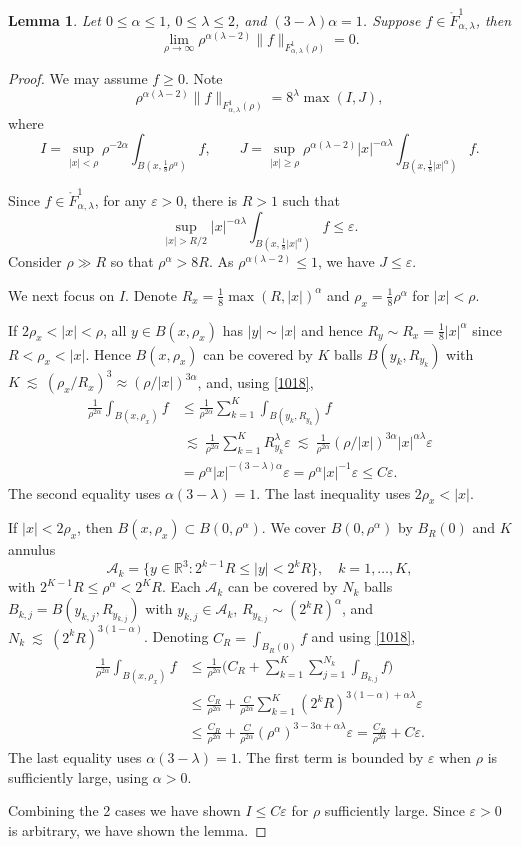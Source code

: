 \documentclass[11pt]{article}
\numberwithin{equation}{section}
\newtheorem{lem}[thm]{Lemma}
\theoremstyle{remark}
\theoremstyle{definition}
\newcommand{\R}{\mathbb{R}}
\newcommand{\lec}{{\ \lesssim \ }}
\newcommand\al{\alpha}
\newcommand\e {\varepsilon}  %
\newcommand\la{\lambda}
\newcommand{\EQ}[1]{\begin{equation} #1 \end{equation}}
\newcommand{\EQN}[1]{\begin{equation*}\begin{split} #1 \end{split}\end{equation*}}
\begin{document}
\begin{lem}\label{lem2.9}
Let $0 \le \al \le 1$, $0 \le \la \le 2$, and $(3-\la)\al=1$. Suppose $f \in \mathring F^1_{\al,\la}$, then
\[
\lim_{\rho\to \infty} \rho^{\al(\la-2)} \|f\|_{F^{1}_{\al,\lambda}(\rho)} =0.
\]
\end{lem}
\begin{proof}
We may assume $f\ge 0$. Note
\[
\rho^{\al(\la-2)} \|f\|_{F^{1}_{\al,\lambda}(\rho)} = 8^\la \max(I,J),
\]
where
\[
I= \sup_{|x|<\rho} \rho^{-2\al} \int_{B(x,\frac18 \rho^\al)} f,\qquad
J= \sup_{|x|\ge\rho} \rho^{\al(\la-2)} |x|^{-\al \la} \int_{B(x,\frac18 |x|^\al)} f.
\]

Since $f \in \mathring F^1_{\al,\la}$,
for any $\e>0$, there is $R>1$ such that
\EQ{\label{1018}
\sup_{|x|>R/2} |x|^{-\al \la} \int_{B(x,\frac18 |x|^\al)} f \le \e.
}
Consider $\rho \gg R$ so that $\rho^\al > 8R$. As $ \rho^{\al(\la-2)}\le1$, we have $J \le \e$.

We next focus on $I$. Denote $R_x = \frac18\max(R,|x|)^\al$ and $\rho_x = \frac18\rho^\al$ for $|x|<\rho$.


If $2\rho_x < |x| < \rho$, all $y \in B(x,\rho_x)$ has $|y| \sim |x|$ and hence $R_y \sim R_x=\frac 18|x|^\al$ since $R< \rho_x<|x|$. Hence $B(x,\rho_x)$ can be covered by $K$ balls $B(y_k,R_{y_k})$ with $K \lec (\rho_x/R_x)^3\approx (\rho/|x|)^{3\al}$, and, using \eqref{1018},
\EQN{
\frac{1}{\rho^{2\al}}\int_{B(x,\rho_x)}f
&\le \frac{1}{\rho^{2\al}}\sum_{k=1}^K \int_{B(y_k, R_{y_k})}f
\\
&\lec \frac{1}{\rho^{2\al}}\sum_{k=1}^K R_{y_k}^\la \e
\lec \frac{1}{\rho^{2\al}} (\rho/|x|)^{3\al} |x|^{\al\la} \e
\\
& = \rho ^\al |x| ^{-(3-\la)\al} \e
= \rho ^\al |x| ^{-1} \e \le C \e.
}
The second equality uses $\al(3-\la)=1$. The last inequality uses $2\rho_x < |x|$.

\medskip
If $|x|<2\rho_x$, then $B(x,\rho_x)\subset B(0,\rho^\al)$. We cover $B(0,\rho^\al)$ by $B_R(0)$ and $K$ annulus
\[
\mathcal A_k = \{ y \in \R^3: 2^{k-1} R \le |y|< 2^{k}R\}, \quad k=1,\ldots,K,
\]
with $2^{K-1} R \le \rho^\al< 2^{K}R$. Each $\mathcal A_k$ can be covered by $N_k$ balls $B_{k,j}=B(y_{k,j}, R_{y_{k,j}})$ with $y_{k,j} \in \mathcal A_k$, $R_{y_{k,j}} \sim ( 2^k R)^\al $, and $N_k \lec ( 2^k R)^{3(1-\al)} $. Denoting $C_R=\int_{B_R(0)} f$ and using \eqref{1018},
\EQN{
\frac{1}{\rho^{2\al}}\int_{B(x,\rho_x)} f
&\le \frac{1}{\rho^{2\al }}\bigg( C_R
+ \sum_{k=1}^K \sum_{j=1}^{N_k} \int_{B_{k,j}} f \bigg)
\\
&\le \frac{C_R}{\rho^{2\al }}
+ \frac{C}{\rho^{2\al }}\sum_{k=1}^K  ( 2^k R)^{3(1-\al)+\al \la} \e
\\
&
\le  \frac{C_R}{\rho^{2\al }}+
 \frac{C}{\rho^{2\al }}(\rho^{\al} )^{3 -3\al+\al \la}\e
 = \frac{C_R}{\rho^{2\al }} +C
 \e.
}
The last equality uses $\al(3-\la)=1$. The first term is bounded by $\e$ when $\rho$ is sufficiently large, using $\al >0$.

Combining the 2 cases we have
shown $I \le C \e$ for $\rho$ sufficiently large. Since $\e>0$ is arbitrary, we have shown the lemma.
\end{proof}
\end{document}
